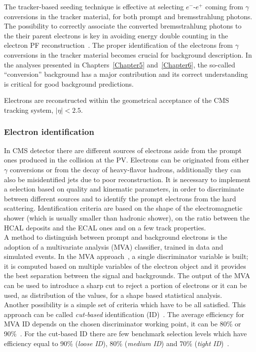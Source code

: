The tracker-based seeding technique is effective at selecting $e^{-}$-$e^{+}$ coming from $\gamma$ conversions
in the tracker material, for both prompt and bremsstrahlung
photons. The possibility to correctly associate the converted
bremsstrahlung photons
to the their parent electrons is key in avoiding energy double
counting in the electron PF reconstruction~\cite{CMS:particleflow}. The proper identification
of the electrons from $\gamma$ conversions
in the tracker material becomes crucial for background description. In
the analyses presented in
Chapters~\ref{Chapter5} and~\ref{Chapter6}, the so-called
``conversion'' background has a major contribution and its correct
understanding is critical for good background
predictions.

Electrons are reconstructed within the geometrical acceptance of the
CMS tracking system, $|\eta|<2.5$.

\subsubsection{Electron identification}\label{sec:c2keleid}
In CMS detector there are different sources of electrons aside from the
prompt ones produced in the collision at the PV. Electrons can be
originated from either $\gamma$ conversions or from the decay of heavy-flavor
hadrons, additionally they can also be misidentified jets due to poor
reconstruction. It is necessary to implement a selection based on quality and
kinematic parameters,  in order to discriminate between different 
sources and to identify the
prompt electrons from the hard scattering.
Identification criteria are based on the shape of the electromagnetic shower
(which is usually smaller than hadronic shower), on the ratio between the
HCAL deposits and the ECAL ones and on a few track properties.\\
A method to distinguish between prompt and background
electrons is the adoption of a multivariate
analysis (MVA) classifier, trained in data and simulated events. In the MVA approach~\cite{mvatwiki}, a
single discriminator variable is built; it is computed based on
multiple variables of the electron object and it provides the best
separation between the signal and backgrounds. The output of the MVA
can be used to introduce a sharp cut to reject a portion of electrons
or it can be used, as distribution of the values, for a shape based
statistical analysis.\\
Another possibility is a simple set of criteria which have to be
all satisfied. This approach can be called \emph{cut-based}
identification (ID)~\cite{cutbasedtwiki}. The average efficiency for MVA
ID depends on the chosen discriminator working point, it can be 80\% or
90\%~\cite{mvatwiki}. For the cut-based ID there are few benchmark selection levels
which have efficiency equal to 90\% (\emph{loose ID}), 80\% (\emph{medium
  ID}) and 70\% (\emph{tight ID})~\cite{cutbasedtwiki}.

